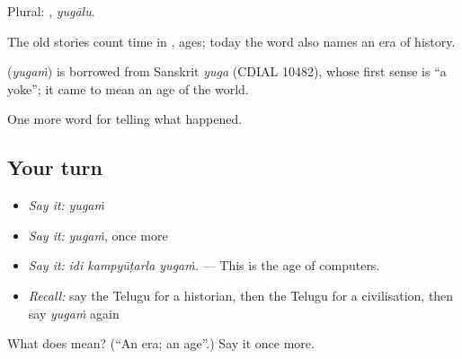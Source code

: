 Plural: , \emph{yugālu}.

The old stories count time in , ages; today the word also names an era of history.

\begin{cousinweb}
\textbf{} (\emph{yugaṁ}) is borrowed from Sanskrit \emph{yuga} (CDIAL 10482), whose first sense is \textquotedblleft{}a yoke\textquotedblright{}; it came to mean an age of the world.
\end{cousinweb}

\begin{grammarlens}[title={What you've built}]
One more word for telling what happened.
\end{grammarlens}

\subsection*{Your turn}
\begin{itemize}
\raggedright
  \item \emph{Say it:} \emph{yugaṁ}
  \item \emph{Say it:} \emph{yugaṁ}, once more
  \item \emph{Say it:} \emph{idi kampyūṭarla yugaṁ.} — This is the age of computers.
  \item \emph{Recall:} say the Telugu for a historian, then the Telugu for a civilisation, then say \emph{yugaṁ} again
\end{itemize}

\begin{tcolorbox}[breakable,colback=teal!4,colframe=teal!35!black,title={Before you move on}]
What does  mean? (\textquotedblleft{}An era; an age\textquotedblright{}.) Say it once more.
\end{tcolorbox}
